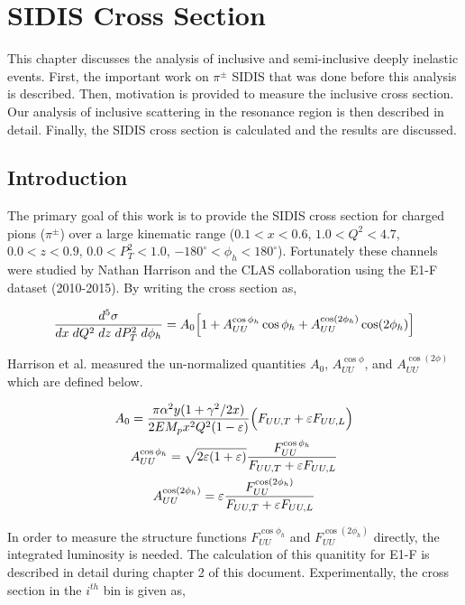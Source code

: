 \chapter{SIDIS Cross Section}

This chapter discusses the analysis of inclusive and semi-inclusive deeply inelastic events.  First, the important work on $\pi^{\pm}$ SIDIS that was done before this analysis is described.  Then, motivation is provided to measure the inclusive cross section.  Our analysis of inclusive scattering in the resonance region is then described in detail.  Finally, the SIDIS cross section is calculated and the results are discussed.

\section{Introduction}

The primary goal of this work is to provide the SIDIS cross section for charged pions ($\pi^{\pm}$) over a large kinematic range ($0.1 < x < 0.6$, $1.0 < Q^2 < 4.7$, $0.0 < z < 0.9$, $0.0 < P_{T}^{2} < 1.0$, $-180^\circ < \phi_h < 180^\circ$).  Fortunately these channels were studied by Nathan Harrison and the CLAS collaboration \cite{thesis-harrison:2015} using the E1-F dataset (2010-2015).  By writing the cross section as, 

\begin{equation}
	\frac{d^5\sigma}{dx \; dQ^2 \; dz \; dP_T^2 \; d\phi_h} = A_{0} \Bigl[ 1 + A_{UU}^{\cos\phi_h} \cos\phi_h + A_{UU}^{\cos(2\phi_h)} \cos(2\phi_h) \Bigr]
\end{equation}

Harrison et al. measured the un-normalized quantities $A_0$, $A_{UU}^{\cos\phi}$, and $A_{UU}^{\cos(2\phi)}$ which are defined below.  

\begin{gather}
	A_{0} = \frac{\pi \alpha^2 y (1+\gamma^2/2x)}{2 E M_p x^2 Q^2 (1-\varepsilon)} \Bigl( F_{UU,T} + \varepsilon F_{UU,L} \Bigr) \\
	A_{UU}^{\cos\phi_h} = \sqrt{2\varepsilon(1+\varepsilon)} \frac{F_{UU}^{\cos\phi_h}}{F_{UU,T} + \varepsilon F_{UU,L}} \\
	A_{UU}^{\cos(2\phi_h)} = \varepsilon \frac{F_{UU}^{\cos(2\phi_h)}}{F_{UU,T} + \varepsilon F_{UU,L}}
\end{gather}

In order to measure the structure functions $F_{UU}^{\cos\phi_h}$ and $F_{UU}^{\cos(2\phi_h)}$ directly, the integrated luminosity is needed.  The calculation of this quanitity for E1-F is described in detail during chapter 2 of this document.  Experimentally, the cross section in the $i^{th}$ bin is given as, 

